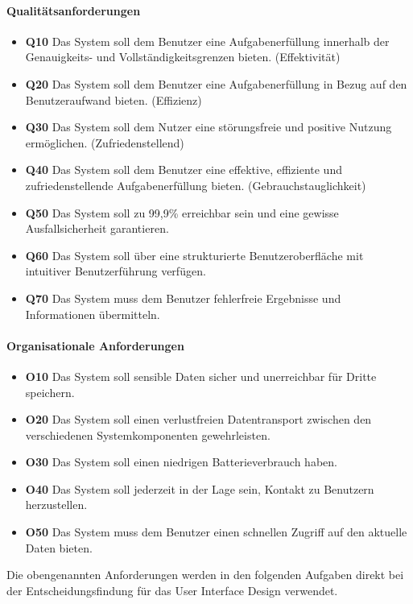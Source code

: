 \paragraph{Qualitätsanforderungen}
\begin{itemize}
	\item\textbf{\lbrack Q10\rbrack} Das System soll dem Benutzer eine Aufgabenerfüllung innerhalb der Genauigkeits- und Vollständigkeitsgrenzen bieten. (Effektivität)
	\item\textbf{\lbrack Q20\rbrack} Das System soll dem Benutzer eine Aufgabenerfüllung in Bezug auf den Benutzeraufwand bieten. (Effizienz)
	\item\textbf{\lbrack Q30\rbrack} Das System soll dem Nutzer eine störungsfreie und positive Nutzung ermöglichen. (Zufriedenstellend)
	\item\textbf{\lbrack Q40\rbrack} Das System soll dem Benutzer eine effektive, effiziente und zufriedenstellende Aufgabenerfüllung bieten. (Gebrauchstauglichkeit)
	\item\textbf{\lbrack Q50\rbrack} Das System soll zu 99,9\% erreichbar sein und eine gewisse Ausfallsicherheit garantieren.
	\item\textbf{\lbrack Q60\rbrack} Das System soll über eine strukturierte Benutzeroberfläche mit intuitiver Benutzerführung verfügen.
	\item\textbf{\lbrack Q70\rbrack} Das System muss dem Benutzer fehlerfreie Ergebnisse und Informationen übermitteln.
\end{itemize}
\paragraph{Organisationale Anforderungen}
\begin{itemize}
	\item\textbf{\lbrack O10\rbrack} Das System soll sensible Daten sicher und unerreichbar für Dritte speichern.
	\item\textbf{\lbrack O20\rbrack} Das System soll einen verlustfreien Datentransport zwischen den verschiedenen Systemkomponenten gewehrleisten.
	\item\textbf{\lbrack O30\rbrack} Das System soll einen niedrigen Batterieverbrauch haben.
	\item\textbf{\lbrack O40\rbrack} Das System soll jederzeit in der Lage sein, Kontakt zu Benutzern herzustellen.
	\item\textbf{\lbrack O50\rbrack} Das System muss dem Benutzer einen schnellen Zugriff auf den aktuelle Daten bieten.
\end{itemize}
	Die obengenannten Anforderungen werden in den folgenden Aufgaben direkt bei der Entscheidungsfindung für das User Interface Design verwendet.